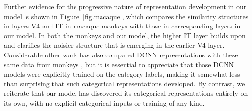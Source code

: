 \documentclass[12pt,twoside,lineno]{pnas-new}  %
\begin{document}
Further evidence for the progressive nature of representation development in our model is shown in Figure~\ref{fig.macaque}, which compares the similarity structures in layers V4 and IT in macaque monkeys \cite{CadieuHongYaminsEtAl14} with those in corresponding layers in our model.  In both the monkeys and our model, the higher IT layer builds upon and clarifies the noisier structure that is emerging in the earlier V4 layer.  Considerable other work has also compared DCNN representations with these same data from monkeys \cite{CadieuHongYaminsEtAl14}, but it is essential to appreciate that those DCNN models were explicitly trained on the category labels, making it somewhat less than surprising that such categorical representations developed.  By contrast, we reiterate that our model has discovered its categorical representations entirely on its own, with no explicit categorical inputs or training of any kind.

\end{document}

